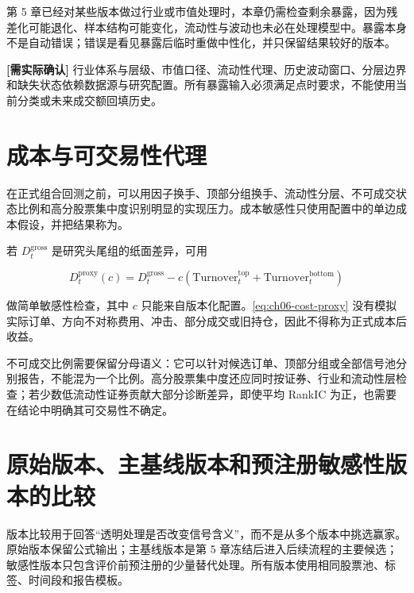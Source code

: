 第 5 章已经对某些版本做过行业或市值处理时，本章仍需检查剩余暴露，因为残差化可能退化、样本结构可能变化，流动性与波动也未必在处理模型中。暴露本身不是自动错误；错误是看见暴露后临时重做中性化，并只保留结果较好的版本。

\begin{confirmbox}
\textbf{[需实际确认]} 行业体系与层级、市值口径、流动性代理、历史波动窗口、分层边界和缺失状态依赖数据源与研究配置。所有暴露输入必须满足点时要求，不能使用当前分类或未来成交额回填历史。
\end{confirmbox}

\section{成本与可交易性代理}

在正式组合回测之前，可以用因子换手、顶部分组换手、流动性分层、不可成交状态比例和高分股票集中度识别明显的实现压力。成本敏感性只使用配置中的单边成本假设，并把结果称为。

若 \(D^{\mathrm{gross}}_t\) 是研究头尾组的纸面差异，可用

\begin{equation}
  D^{\mathrm{proxy}}_t(c)
  =
  D^{\mathrm{gross}}_t
  -c\left(
    \mathrm{Turnover}^{\mathrm{top}}_t
    +\mathrm{Turnover}^{\mathrm{bottom}}_t
  \right)
  \label{eq:ch06-cost-proxy}
\end{equation}

做简单敏感性检查，其中 \(c\) 只能来自版本化配置。\cref{eq:ch06-cost-proxy} 没有模拟实际订单、方向不对称费用、冲击、部分成交或旧持仓，因此不得称为正式成本后收益。

不可成交比例需要保留分母语义：它可以针对候选订单、顶部分组或全部信号池分别报告，不能混为一个比例。高分股票集中度还应同时按证券、行业和流动性层检查；若少数低流动性证券贡献大部分诊断差异，即使平均 RankIC 为正，也需要在结论中明确其可交易性不确定。

\section{原始版本、主基线版本和预注册敏感性版本的比较}

版本比较用于回答“透明处理是否改变信号含义”，而不是从多个版本中挑选赢家。原始版本保留公式输出；主基线版本是第 5 章冻结后进入后续流程的主要候选；敏感性版本只包含评价前预注册的少量替代处理。所有版本使用相同股票池、标签、时间段和报告模板。

